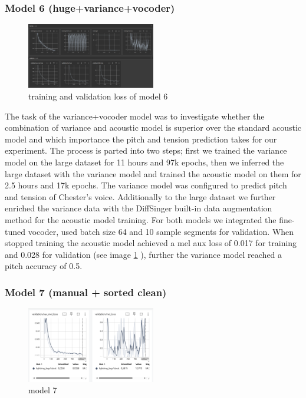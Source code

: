 \documentclass[a4paper]{article}
\begin{document}
	
	\subsubsection{Model 6 (huge+variance+vocoder)}
	
	\begin{figure}[htbp]
		\centering
		\includegraphics[width=0.5\textwidth]{graphics/v6_training+testing.png}
		\caption{training and validation loss of model 6}
		\label{fig:model6}
	\end{figure}
	
	The task of the variance+vocoder model was to investigate whether the combination of variance and acoustic model is superior over the standard acoustic model and which importance the pitch and tension prediction takes for our experiment. The process is parted into two steps; first we trained the variance model on the large dataset for 11 hours and 97k epochs, then we inferred the large dataset with the variance model and trained the acoustic model on them for 2.5 hours and 17k epochs. The variance model was configured to predict pitch and tension of Chester’s voice. Additionally to the large dataset we further enriched the variance data with the DiffSinger built-in data augmentation method for the acoustic model training.  For both models we integrated the fine-tuned vocoder, used batch size 64  and 10 sample segments for validation. When stopped training the acoustic model achieved a mel aux loss of 0.017 for training and 0.028 for validation (see image \ref{fig:model6} ), further the variance model reached a pitch accuracy of 0.5.
	
	
	\subsubsection{Model 7 (manual + sorted clean)}
	
	\begin{figure}[htbp]
		\centering
		\includegraphics[width=0.5\textwidth]{graphics/v7_testing.png}
		\caption{model 7}
		\label{fig:bild4}
	\end{figure}
	
\end{document}
